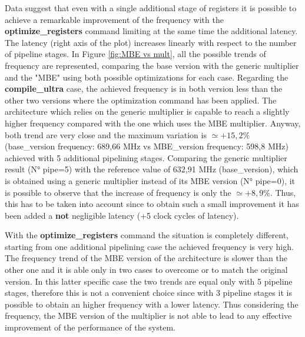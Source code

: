 \documentclass[a4paper, titlepage]{article}
\begin{document}
\newline
Data suggest that even with a single additional stage of registers it is possible to achieve a remarkable improvement of the frequency with the \textbf{optimize\_registers} command limiting at the same time the additional latency.
\newline
The latency (right axis of the plot) increases linearly with respect to the number of pipeline stages.
\newline
In Figure \ref{fig:MBE vs mult},
all the possible trends of frequency are represented, comparing the base version with the generic multiplier and the "MBE" using both possible optimizations for each case.
\newline
Regarding the \textbf{compile\_ultra} case, the achieved frequency is in both version less than the other two versions where the optimization command has been applied.
The architecture which relies on the generic multiplier is capable to reach a slightly higher frequency compared with the one which uses the MBE multiplier. Anyway, both trend are very close and the maximum variation is $\simeq +15,2\%$ (base\_version frequency: 689,66 MHz vs MBE\_version frequency: 598,8 MHz)
achieved with 5 additional pipelining stages. 
\newline 
Comparing the generic multiplier result (N° pipe=5) with the reference value of 632,91 MHz (base\_version), which is obtained using a generic multiplier instead of its MBE version (N° pipe=0), it is possible to observe that the increase of frequency is only the $\simeq +8,9\%$. Thus, this has to be taken into account since to obtain such a small improvement it has been added a \textbf{not} negligible latency (+5 clock cycles of latency).
\newline

\noindent
With the \textbf{optimize\_registers} command the situation is completely different, starting from one additional pipelining case the achieved frequency is very high. The frequency trend of the  MBE version of the architecture is slower than the other one and it is able only in two cases to overcome or to match the original version.
In this latter specific case the two trends are equal only with 5 pipeline stages, therefore this is not a convenient choice since with 3 pipeline stages it is possible to obtain an higher frequency with a lower latency.
\newline Thus considering the frequency, the MBE version of the multiplier is not able to lead to any effective improvement of the performance of the system.
\end{document}
